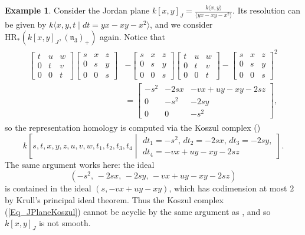 \documentclass{article}
\numberwithin{equation}{section} %
\theoremstyle{plain}
\theoremstyle{definition}
\newtheorem{example}[theorem]{Example}
\theoremstyle{remark}
\begin{document}
\begin{example}\label{Example_JordanPlane}
Consider the Jordan plane $\displaystyle k[x,y]_J=\frac{k\langle x,y\rangle}{\langle yx-xy-x^2\rangle}$.
Its resolution can be given by $k\langle x,y,t\mid dt=yx-xy-x^2\rangle$, and we consider $\mathrm{HR}_*(k[x,y]_J,(\mathfrak{n}_3)_+)$ again.
Notice that
\begin{align*}
\begin{split}
\begin{bmatrix}t&u&w\\ 0&t&v\\ 0&0&t\end{bmatrix}\begin{bmatrix}s&x&z\\ 0&s&y\\ 0&0&s\end{bmatrix}&-\begin{bmatrix}s&x&z\\ 0&s&y\\ 0&0&s\end{bmatrix}\begin{bmatrix}t&u&w\\ 0&t&v\\ 0&0&t\end{bmatrix}-\begin{bmatrix}s&x&z\\ 0&s&y\\ 0&0&s\end{bmatrix}^2\\ &=\begin{bmatrix}-s^2&-2sx&-vx+uy-xy-2sz\\ 0&-s^2&-2sy\\ 0&0&-s^2\end{bmatrix},
\end{split}
\end{align*}
so the representation homology is computed via the Koszul complex (\cite[Theorem 2.8]{BKR13})
\begin{equation}\label{Eq_JPlaneKoszul}
k\left[s,t,x,y,z,u,v,w,t_1,t_2,t_3,t_4\middle| \begin{matrix}
dt_1=-s^2,\,dt_2=-2sx,\,dt_3=-2sy,\\ dt_4=-vx+uy-xy-2sz\end{matrix}\right].
\end{equation}
The same argument works here: the ideal
\begin{equation*}
\left(-s^2,\,-2sx,\,-2sy,\,-vx+uy-xy-2sz\right)
\end{equation*}
is contained in the ideal $(s,-vx+uy-xy)$, which has codimension at most $2$ by Krull's principal ideal theorem.
Thus the Koszul complex (\ref{Eq_JPlaneKoszul}) cannot be acyclic by the same argument as , and so $k[x,y]_J$ is not smooth.
\end{example}
\end{document}
